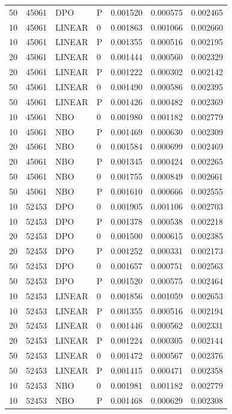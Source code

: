 \begin{longtable}{rrllrrr}
50 & 45061 & DPO & P & 0.001520 & 0.000575 & 0.002465\\
10 & 45061 & LINEAR & 0 & 0.001863 & 0.001066 & 0.002660\\
10 & 45061 & LINEAR & P & 0.001355 & 0.000516 & 0.002195\\
20 & 45061 & LINEAR & 0 & 0.001444 & 0.000560 & 0.002329\\
20 & 45061 & LINEAR & P & 0.001222 & 0.000302 & 0.002142\\
50 & 45061 & LINEAR & 0 & 0.001490 & 0.000586 & 0.002395\\
50 & 45061 & LINEAR & P & 0.001426 & 0.000482 & 0.002369\\
10 & 45061 & NBO & 0 & 0.001980 & 0.001182 & 0.002779\\
10 & 45061 & NBO & P & 0.001469 & 0.000630 & 0.002309\\
20 & 45061 & NBO & 0 & 0.001584 & 0.000699 & 0.002469\\
20 & 45061 & NBO & P & 0.001345 & 0.000424 & 0.002265\\
50 & 45061 & NBO & 0 & 0.001755 & 0.000849 & 0.002661\\
50 & 45061 & NBO & P & 0.001610 & 0.000666 & 0.002555\\
10 & 52453 & DPO & 0 & 0.001905 & 0.001106 & 0.002703\\
10 & 52453 & DPO & P & 0.001378 & 0.000538 & 0.002218\\
20 & 52453 & DPO & 0 & 0.001500 & 0.000615 & 0.002385\\
20 & 52453 & DPO & P & 0.001252 & 0.000331 & 0.002173\\
50 & 52453 & DPO & 0 & 0.001657 & 0.000751 & 0.002563\\
50 & 52453 & DPO & P & 0.001520 & 0.000575 & 0.002464\\
10 & 52453 & LINEAR & 0 & 0.001856 & 0.001059 & 0.002653\\
10 & 52453 & LINEAR & P & 0.001355 & 0.000516 & 0.002194\\
20 & 52453 & LINEAR & 0 & 0.001446 & 0.000562 & 0.002331\\
20 & 52453 & LINEAR & P & 0.001224 & 0.000305 & 0.002144\\
50 & 52453 & LINEAR & 0 & 0.001472 & 0.000567 & 0.002376\\
50 & 52453 & LINEAR & P & 0.001415 & 0.000471 & 0.002358\\
10 & 52453 & NBO & 0 & 0.001981 & 0.001182 & 0.002779\\
10 & 52453 & NBO & P & 0.001468 & 0.000629 & 0.002308\\

\end{longtable}
